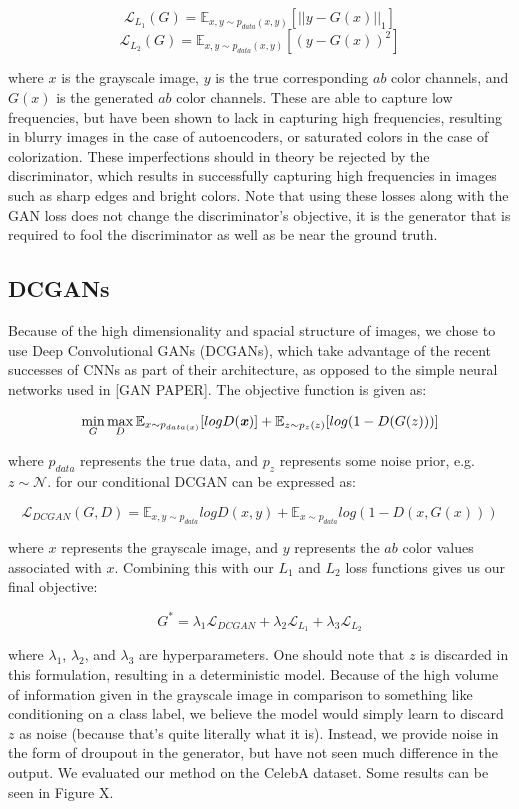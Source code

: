 \documentclass[10pt]{article}
\begin{document}
\[ \mathcal{L}_{L_1}(G) = \mathbb{E}_{x,y\sim p_{data}(x,y)}[||y-G(x)||_1] \]
\[ \mathcal{L}_{L_2}(G) = \mathbb{E}_{x,y\sim p_{data}(x,y)}[(y-G(x))^2] \]


\noindent where $x$ is the grayscale image, $y$ is the true corresponding $ab$ color channels, and $G(x)$ is the generated $ab$ color channels. These are able to capture low frequencies, but have been shown to lack in 
capturing high frequencies, resulting in blurry images in the case of autoencoders, or saturated colors in
the case of colorization. These imperfections should in theory be rejected by the discriminator, which
results in successfully capturing high frequencies in images such as sharp edges and bright colors. Note
that using these losses along with the GAN loss does not change the discriminator's objective, it is the
generator that is required to fool the discriminator as well as be near the ground truth.

\subsection{DCGANs}
Because of the high dimensionality and spacial structure of images, we chose to use Deep Convolutional GANs
(DCGANs), which take advantage of the recent successes of CNNs as part of
their architecture, as opposed to the simple neural networks used in [GAN PAPER]. The objective function is
given as:

\[\min\limits_{G}\max\limits_{D} \mathbb{E}_{x \sim p_{data(x)}} [logD(\textbf{\textit{x}})] + \mathbb{E}_{z \sim p_z(z)}[log(1 - D(G(z)))]\]

\noindent where $p_{data}$ represents the true data, and $p_z$ represents some noise prior, e.g.
$z \sim \mathcal{N}$. 
for our conditional DCGAN can be expressed as:

\[ \mathcal{L}_{DCGAN}(G,D) = \mathbb{E}_{x,y \sim p_{data}} log D(x,y) + \mathbb{E}_{x \sim p_{data}}
log (1-D(x, G(x)))\]

\noindent where $x$ represents the grayscale image, and $y$ represents the $ab$ color values associated with
$x$. Combining this with our $L_1$ and $L_2$ loss functions gives us our final objective:

\[ G^* = \lambda_1 \mathcal{L}_{DCGAN} + \lambda_2 \mathcal{L}_{L_1} + \lambda_3 \mathcal{L}_{L_2} \]

\noindent where $\lambda_1$, $\lambda_2$, and $\lambda_3$ are hyperparameters. One should note that $z$
is discarded in this formulation, resulting in a deterministic model. Because of the high volume of information
given in the grayscale image in comparison to something like
conditioning on a class label, we believe the model would simply learn to discard $z$ as noise
(because that's quite literally what it is). Instead, we provide noise in the form of droupout in the
generator, but have not seen much difference in the output. We evaluated our method on the CelebA
dataset. Some results can be seen in Figure X. 
\end{document}
